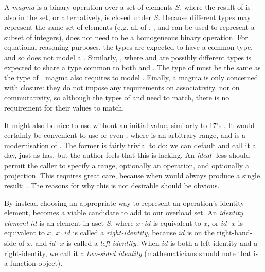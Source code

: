 \begin{itemdescr}
\pnum
A \textit{magma} is a binary operation  over a set of elements $S$, where the result of
 is also in the set, or alternatively,  is closed under
$S$\cite{wikipedia_magma}. Because different types may represent the same set of elements (e.g. all
of , , and  can be used to represent a subset of
integers),  does not need to be a homogeneous binary operation. For equational reasoning
purposes, the types are expected to have a common type, and so  does not
model a . Similarly, , where  and  are possibly
different types is expected to share a type common to both  and . The type of
 must be the same as the type of . magma also requires 
to model . Finally, a magma is only concerned with closure: they do not
impose any requirements on associativity, nor on commutativity, so although the types of
 and  need to match, there is no requirement for their values to
match.
\end{itemdescr}

It might also be nice to use  without an initial value, similarly to \Cpp{}17's
. It would certainly be convenient to use  or even
, where  is an arbitrary range, and
 is a modernisation of . The former is fairly trivial
to do: we can default  and call it a day, just as  has, but
the author feels that this is lacking. An \textit{ideal} -less  should
permit the caller to specify a range, optionally an operation, and optionally a projection. This
requires great care, because  when  would always
produce a single result: . The reasons for why this is not desirable should be obvious.

By instead choosing an appropriate way to represent an operation's identity element,
 becomes a viable candidate to add to our overload set. An
\textit{identity element} $id$ is an element in aset $S$, where $x \cdot id$ is equivalent to $x$,
or $id \cdot x$ is equivalent to $x$. $x \cdot id$ is called a \textit{right-identity}, because $id$
is on the right-hand-side of $x$, and $id \cdot x$ is called a \textit{left-identity}. When $id$ is
both a left-identity and a right-identity, we call it a \textit{two-sided identity} (mathematicians
should note that  is a function object).

